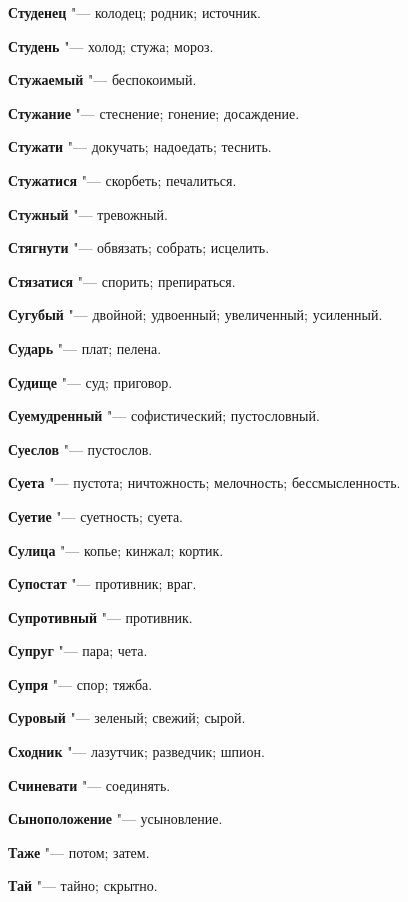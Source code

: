 \begin{mymulticols}
\noindent\textbf{Студенец} "--- колодец; родник; источник. 

\noindent\textbf{Студень} "--- холод; стужа; мороз. 

\noindent\textbf{Стужаемый} "--- беспокоимый. 

\noindent\textbf{Стужание} "--- стеснение; гонение; досаждение. 

\noindent\textbf{Стужати} "--- докучать; надоедать; теснить. 

\noindent\textbf{Стужатися} "--- скорбеть; печалиться. 

\noindent\textbf{Стужный} "--- тревожный. 

\noindent\textbf{Стягнути} "--- обвязать; собрать; исцелить. 

\noindent\textbf{Стязатися} "--- спорить; препираться. 

\noindent\textbf{Сугубый} "--- двойной; удвоенный; увеличенный; усиленный. 

\noindent\textbf{Сударь} "--- плат; пелена. 

\noindent\textbf{Судище} "--- суд; приговор. 

\noindent\textbf{Суемудренный} "--- софистический; пустословный. 

\noindent\textbf{Суеслов} "--- пустослов. 

\noindent\textbf{Суета} "--- пустота; ничтожность; мелочность; бессмысленность. 

\noindent\textbf{Суетие} "--- суетность; суета. 

\noindent\textbf{Сулица} "--- копье; кинжал; кортик. 

\noindent\textbf{Супостат} "--- противник; враг. 

\noindent\textbf{Супротивный} "--- противник. 

\noindent\textbf{Супруг} "--- пара; чета. 

\noindent\textbf{Супря} "--- спор; тяжба. 

\noindent\textbf{Суровый} "--- зеленый; свежий; сырой. 

\noindent\textbf{Сходник} "--- лазутчик; разведчик; шпион. 

\noindent\textbf{Счиневати} "--- соединять. 

\noindent\textbf{Сыноположение} "--- усыновление. 

\bukvaending


\noindent\textbf{Таже} "--- потом; затем. 

\noindent\textbf{Тай} "--- тайно; скрытно. 


\end{mymulticols}
